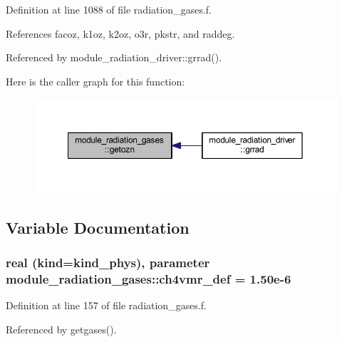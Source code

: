 Definition at line 1088 of file radiation\+\_\+gases.\+f.



References facoz, k1oz, k2oz, o3r, pkstr, and raddeg.



Referenced by module\+\_\+radiation\+\_\+driver\+::grrad().



Here is the caller graph for this function\+:
\nopagebreak
\begin{figure}[H]
\begin{center}
\leavevmode
\includegraphics[width=350pt]{group__module__radiation__gases_gad43e55be9ef69dc68577237e9ce0f127_icgraph}
\end{center}
\end{figure}




\subsection{Variable Documentation}
\subsubsection[{\texorpdfstring{ch4vmr\+\_\+def}{ch4vmr_def}}]{\setlength{\rightskip}{0pt plus 5cm}real (kind=kind\+\_\+phys), parameter module\+\_\+radiation\+\_\+gases\+::ch4vmr\+\_\+def = 1.\+50e-\/6\hspace{0.3cm}{\ttfamily [private]}}\hypertarget{group__module__radiation__gases_gaad928d9e0064905a0b6e1eb8bb59bd23}{}\label{group__module__radiation__gases_gaad928d9e0064905a0b6e1eb8bb59bd23}


Definition at line 157 of file radiation\+\_\+gases.\+f.



Referenced by getgases().

